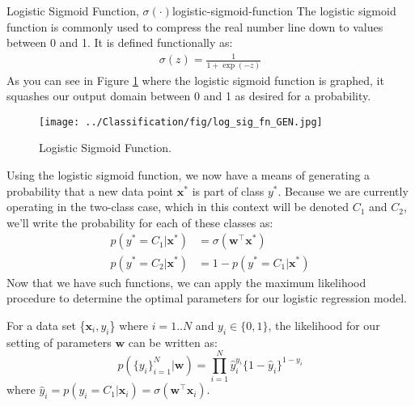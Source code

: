 \begin{definition}{Logistic Sigmoid Function, $\sigma(\cdot)$}{logistic-sigmoid-function}
	The logistic sigmoid function is commonly used to compress the real number line down to values between 0 and 1. It is defined functionally as:
	\begin{align*}
		\sigma(z) = \frac{1}{1 + \exp{(-z)}}
	\end{align*}
	As you can see in Figure \ref{fig:log-sig-fn} where the logistic sigmoid function is graphed, it squashes our output domain between 0 and 1 as desired for a probability.
\end{definition}

\begin{figure}
    \centering
    \texttt{[image: ../Classification/fig/log\_sig\_fn\_GEN.jpg]}
    \caption{Logistic Sigmoid Function.}
    \label{fig:log-sig-fn}
\end{figure}


Using the logistic sigmoid function, we now have a means of generating a probability that a new data point $\textbf{x}^{*}$ is part of class $y^{*}$. Because we are currently operating in the two-class case, which in this context will be denoted $C_{1}$ and $C_{2}$, we'll write the probability for each of these classes as:
\begin{align*}
	p(y^{*}=C_{1}|\textbf{x}^{*}) &= \sigma(\textbf{w}^\top\textbf{x}^{*}) \\
	p(y^{*}=C_{2}|\textbf{x}^{*}) &= 1 - p(y^{*}=C_{1}|\textbf{x}^{*})
\end{align*}
Now that we have such functions, we can apply the maximum likelihood procedure to determine the optimal parameters for our logistic regression model.

For a data set \{$\textbf{x}_{i}, y_{i}$\} where $i = 1..N$ and $y_{i} \in \{0,1\}$, the likelihood for our setting of parameters $\textbf{w}$ can be written as:
\begin{equation} \label{log-reg-likelihood}
	p(\{y_{i}\}_{i=1}^{N}|\textbf{w}) = \prod_{i=1}^{N} \hat{y}_{i}^{y_{i}} \{1 - \hat{y}_{i}\}^{1 - y_{i}}
\end{equation}
where $\hat{y}_{i} = p(y_{i}=C_{1}|\textbf{x}_{i}) = \sigma(\textbf{w}^\top\textbf{x}_{i})$.

